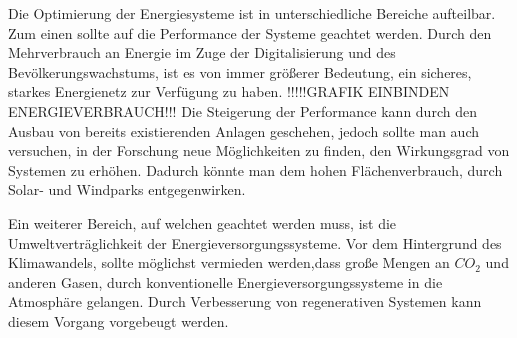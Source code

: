 Die Optimierung der Energiesysteme ist in unterschiedliche Bereiche aufteilbar.
Zum einen sollte auf die Performance der Systeme geachtet werden. Durch den
Mehrverbrauch an Energie im Zuge der Digitalisierung und des
Bevölkerungswachstums, ist es von immer größerer Bedeutung, ein sicheres,
starkes Energienetz zur Verfügung zu haben. !!!!!GRAFIK EINBINDEN
ENERGIEVERBRAUCH!!! Die Steigerung der Performance kann durch den Ausbau von
bereits existierenden Anlagen geschehen, jedoch sollte man auch versuchen, in
der Forschung neue Möglichkeiten zu finden, den Wirkungsgrad von Systemen zu
erhöhen. Dadurch könnte man dem hohen Flächenverbrauch, durch Solar- und
Windparks entgegenwirken.

Ein weiterer Bereich, auf welchen geachtet werden muss, ist die
Umweltverträglichkeit der Energieversorgungssysteme. Vor dem Hintergrund des
Klimawandels, sollte möglichst vermieden werden,dass große Mengen an $CO_2$ und
anderen Gasen, durch konventionelle Energieversorgungssysteme in die Atmosphäre
gelangen. Durch Verbesserung von regenerativen Systemen kann diesem Vorgang vorgebeugt werden.
